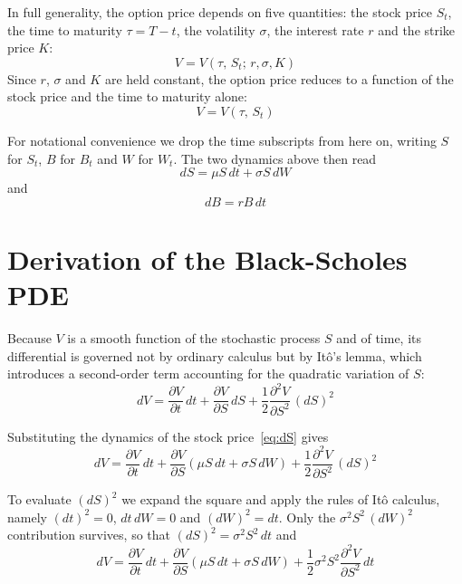 \documentclass[a4paper,12pt]{article}
\numberwithin{equation}{section}
\begin{document}
In full generality, the option price depends on five quantities: the stock price
$S_t$, the time to maturity $\tau = T - t$, the volatility $\sigma$, the interest
rate $r$ and the strike price $K$:
\begin{equation}\label{eq:vfull}
  V = V(\tau,\,S_t;\, r, \sigma, K) 
\end{equation}
Since $r$, $\sigma$ and $K$ are held constant, the option price reduces to a
function of the stock price and the time to maturity alone:
\begin{equation}\label{eq:vreduced}
  V = V(\tau,\,S_t) 
\end{equation}

For notational convenience we drop the time subscripts from here on, writing $S$
for $S_t$, $B$ for $B_t$ and $W$ for $W_t$. The two dynamics above then read
\begin{equation}\label{eq:dS}
  dS = \mu S\,dt + \sigma S\,dW
\end{equation}
and
\begin{equation}\label{eq:dB}
  dB = r B\,dt 
\end{equation}

\section{Derivation of the Black-Scholes PDE}\label{sec:bs-pde}

Because $V$ is a smooth function of the stochastic process $S$ and of time, its
differential is governed not by ordinary calculus but by It\^o's lemma, which
introduces a second-order term accounting for the quadratic variation of $S$:
\begin{equation}\label{eq:ito}
  dV = \frac{\partial V}{\partial t}\,dt
     + \frac{\partial V}{\partial S}\,dS
     + \frac{1}{2}\frac{\partial^2 V}{\partial S^2}\,(dS)^2 
\end{equation}

Substituting the dynamics of the stock price~\eqref{eq:dS} gives
\begin{equation}\label{eq:ito-sub}
  dV = \frac{\partial V}{\partial t}\,dt
     + \frac{\partial V}{\partial S}\left(\mu S\,dt + \sigma S\,dW\right)
     + \frac{1}{2}\frac{\partial^2 V}{\partial S^2}\,(dS)^2 
\end{equation}

To evaluate $(dS)^2$ we expand the square and apply the rules of It\^o calculus,
namely $(dt)^2 = 0$, $dt\,dW = 0$ and $(dW)^2 = dt$. Only the
$\sigma^2 S^2\,(dW)^2$ contribution survives, so that $(dS)^2 = \sigma^2 S^2\,dt$
and
\begin{equation}\label{eq:ito-ds2}
  dV = \frac{\partial V}{\partial t}\,dt
     + \frac{\partial V}{\partial S}\left(\mu S\,dt + \sigma S\,dW\right)
     + \frac{1}{2}\sigma^2 S^2\frac{\partial^2 V}{\partial S^2}\,dt 
\end{equation}
\end{document}
